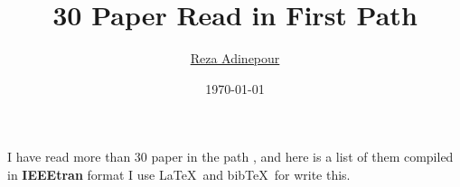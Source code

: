 \documentclass[a4paper,10pt]{article}
\title{30 Paper Read in First Path}
\author{\href{https://github.com/rezaAdinepour}{Reza Adinepour}}
\date{\today}
\begin{document}
	\maketitle
	
	
	I have read more than 30 paper in the  path , and here is a list of them compiled in \textbf{IEEEtran} format I use \LaTeX \ and bib\TeX \ for write this.
	
	
	

	
	
\end{document}
